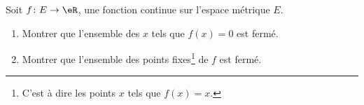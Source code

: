 
\begin{exercice}\label{exo0085}

Soit $f\colon E\to \eR$, une fonction continue sur l'espace métrique $E$.
\begin{enumerate}

\item
Montrer que l'ensemble des $x$ tels que $f(x)=0$ est fermé.

\item
Montrer que l'ensemble des points fixes\footnote{C'est à dire les points $x$ tels que $f(x)=x$.} de $f$ est fermé.

\end{enumerate}

\end{exercice}
